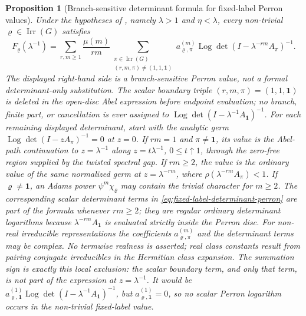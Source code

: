 \documentclass[11pt,a4paper]{amsart}
\theoremstyle{plain}
\newtheorem{proposition}[theorem]{Proposition}
\theoremstyle{definition}
\theoremstyle{remark}
\DeclareMathOperator{\Irr}{Irr}
\DeclareMathOperator{\Log}{Log}
\begin{document}
\begin{proposition}[Branch-sensitive determinant formula for fixed-label Perron values]
  \label{prop:fixed-label-determinant-perron}
  Under the hypotheses of , namely
  \(\lambda>1\) and \(\eta<\lambda\), every
  non-trivial \(\varrho\in\Irr(G)\) satisfies
  \begin{equation}\label{eq:fixed-label-determinant-perron}
    F_\varrho(\lambda^{-1})
    =
    \sum_{r,m\ge1}\frac{\mu(m)}{rm}
      \sum_{\substack{\pi\in\Irr(G)\\(r,m,\pi)\neq(1,1,\mathbf1)}}
        a_{\varrho,\pi}^{(m)}
        \Log\det(I-\lambda^{-rm}A_\pi)^{-1}.
  \end{equation}
  The displayed right-hand side is a branch-sensitive Perron value, not a
  formal determinant-only substitution.  The scalar boundary triple
  \((r,m,\pi)=(1,1,\mathbf1)\) is deleted in the open-disc Abel expression
  before endpoint evaluation; no branch, finite part, or cancellation is ever
  assigned to
  \(\Log\det(I-\lambda^{-1}A_{\mathbf1})^{-1}\).  For each remaining displayed
  determinant, start with the analytic germ
  \(\Log\det(I-zA_\pi)^{-1}=0\) at \(z=0\).  If \(rm=1\) and
  \(\pi\neq\mathbf1\), its value is the Abel-path continuation to
  \(z=\lambda^{-1}\) along \(z=t\lambda^{-1}\),
  \(0\le t\uparrow1\), through the zero-free region supplied by the
  twisted spectral gap.  If \(rm\ge2\), the value is the ordinary value of
  the same normalized germ at \(z=\lambda^{-rm}\), where
  \(\rho(\lambda^{-rm}A_\pi)<1\).
  If \(\varrho\neq\mathbf1\), an Adams power \(\psi^m\chi_\varrho\) may
  contain the trivial character for \(m\ge2\).  The corresponding scalar
  determinant terms in \eqref{eq:fixed-label-determinant-perron} are part
  of the formula whenever \(rm\ge2\); they are regular ordinary
  determinant logarithms because \(\lambda^{-rm}A_{\mathbf1}\) is evaluated
  strictly inside the Perron disc.
  For non-real irreducible representations the coefficients
  \(a_{\varrho,\pi}^{(m)}\) and the determinant terms may be complex.  No
  termwise realness is asserted; real class constants result from pairing
  conjugate irreducibles in the Hermitian class expansion.
  The summation sign is exactly this local exclusion: the scalar boundary term,
  and only that term, is not part of the expression at \(z=\lambda^{-1}\). It
  would be
  \(a_{\varrho,\mathbf1}^{(1)}
  \Log\det(I-\lambda^{-1}A_{\mathbf1})^{-1}\), but
  \(a_{\varrho,\mathbf1}^{(1)}=0\), so no scalar Perron logarithm occurs
  in the non-trivial fixed-label value.
\end{proposition}
\end{document}
